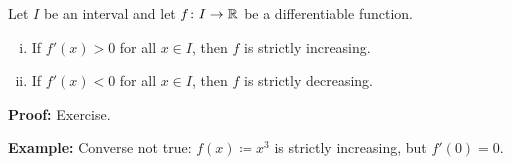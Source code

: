 \documentclass[10pt,aspectratio=169]{beamer}
\begin{document}
\begin{frame}

\begin{proposition}
Let $I$ be an interval and
let $f \colon I \to {\mathbb{R}}$ be a differentiable function.
\begin{enumerate}[(i)]
\item
\pause
If $f'(x) > 0$ for all $x \in I$, then
$f$ is strictly increasing.
\item
\pause
If $f'(x) < 0$ for all $x \in I$,
then $f$ is strictly decreasing.
\end{enumerate}
\end{proposition}

\pause
\textbf{Proof:} Exercise.

\pause
\medskip

\textbf{Example:} Converse not true: 
$f(x) \coloneqq x^3$ is strictly increasing, but $f'(0) = 0$.

\end{frame}

%
%
%
%
%
%
\end{document}
